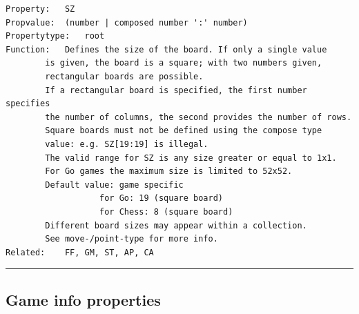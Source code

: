 \begin{verbatim}
Property:   SZ
Propvalue:  (number | composed number ':' number)
Propertytype:   root
Function:   Defines the size of the board. If only a single value
        is given, the board is a square; with two numbers given,
        rectangular boards are possible.
        If a rectangular board is specified, the first number specifies
        the number of columns, the second provides the number of rows.
        Square boards must not be defined using the compose type
        value: e.g. SZ[19:19] is illegal.
        The valid range for SZ is any size greater or equal to 1x1.
        For Go games the maximum size is limited to 52x52.
        Default value: game specific
                   for Go: 19 (square board)
                   for Chess: 8 (square board)
        Different board sizes may appear within a collection.
        See move-/point-type for more info.
Related:    FF, GM, ST, AP, CA
\end{verbatim}

\begin{center}\rule{0.5\linewidth}{0.5pt}\end{center}

\subsection{Game info properties}\label{game-info-properties}

